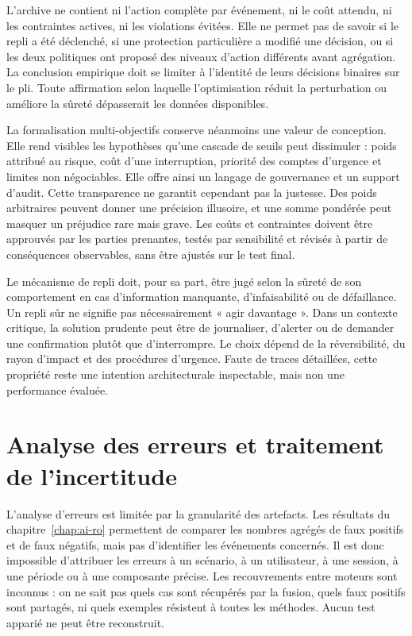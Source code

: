 \documentclass[11pt,a4paper,oneside]{report}
\theoremstyle{definition}
\theoremstyle{plain}
\begin{document}
L'archive ne contient ni l'action complète par événement, ni le coût attendu,
ni les contraintes actives, ni les violations évitées. Elle ne permet pas de
savoir si le repli a été déclenché, si une protection particulière a modifié
une décision, ou si les deux politiques ont proposé des niveaux d'action
différents avant agrégation. La conclusion empirique doit se limiter à
l'identité de leurs décisions binaires sur le pli. Toute affirmation selon
laquelle l'optimisation réduit la perturbation ou améliore la sûreté dépasserait
les données disponibles.

La formalisation multi-objectifs conserve néanmoins une valeur de conception.
Elle rend visibles les hypothèses qu'une cascade de seuils peut dissimuler :
poids attribué au risque, coût d'une interruption, priorité des comptes
d'urgence et limites non négociables. Elle offre ainsi un langage de
gouvernance et un support d'audit. Cette transparence ne garantit cependant pas
la justesse. Des poids arbitraires peuvent donner une précision illusoire, et
une somme pondérée peut masquer un préjudice rare mais grave. Les coûts et
contraintes doivent être approuvés par les parties prenantes, testés par
sensibilité et révisés à partir de conséquences observables, sans être ajustés
sur le test final.

Le mécanisme de repli doit, pour sa part, être jugé selon la sûreté de son
comportement en cas d'information manquante, d'infaisabilité ou de défaillance.
Un repli sûr ne signifie pas nécessairement « agir davantage ». Dans un
contexte critique, la solution prudente peut être de journaliser, d'alerter ou
de demander une confirmation plutôt que d'interrompre. Le choix dépend de la
réversibilité, du rayon d'impact et des procédures d'urgence. Faute de traces
détaillées, cette propriété reste une intention architecturale inspectable,
mais non une performance évaluée.

\section{Analyse des erreurs et traitement de l'incertitude}
\label{sec:validation-errors}

L'analyse d'erreurs est limitée par la granularité des artefacts. Les résultats
du chapitre~\ref{chap:ai-ro} permettent de comparer les nombres agrégés de faux
positifs et de faux négatifs, mais pas d'identifier les événements concernés.
Il est donc impossible d'attribuer les erreurs à un scénario, à un utilisateur,
à une session, à une période ou à une composante précise. Les recouvrements
entre moteurs sont inconnus : on ne sait pas quels cas sont récupérés par la
fusion, quels faux positifs sont partagés, ni quels exemples résistent à toutes
les méthodes. Aucun test apparié ne peut être reconstruit.
\end{document}
